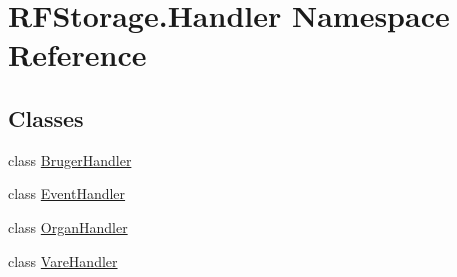 \hypertarget{namespace_r_f_storage_1_1_handler}{}\section{R\+F\+Storage.\+Handler Namespace Reference}
\label{namespace_r_f_storage_1_1_handler}
\subsection*{Classes}
\begin{DoxyCompactItemize}
\item 
class \mbox{\hyperlink{class_r_f_storage_1_1_handler_1_1_bruger_handler}{Bruger\+Handler}}
\item 
class \mbox{\hyperlink{class_r_f_storage_1_1_handler_1_1_event_handler}{Event\+Handler}}
\item 
class \mbox{\hyperlink{class_r_f_storage_1_1_handler_1_1_organ_handler}{Organ\+Handler}}
\item 
class \mbox{\hyperlink{class_r_f_storage_1_1_handler_1_1_vare_handler}{Vare\+Handler}}
\end{DoxyCompactItemize}
